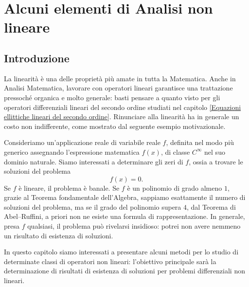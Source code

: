 

\chapter{Alcuni elementi di Analisi non lineare}\label{Alcuni elementi di Analisi non lineare}

\section{Introduzione}
La linearità è una delle proprietà più amate in tutta la Matematica. Anche in Analisi Matematica, lavorare con operatori lineari garantisce una trattazione pressoché organica e molto generale: basti pensare a quanto visto per gli operatori differenziali lineari del secondo ordine studiati nel capitolo \ref{Equazioni ellittiche lineari del secondo ordine}. Rinunciare alla linearità ha in generale un costo non indifferente, come mostrato dal seguente esempio motivazionale.
\begin{esempio}\label{equazionialgebriche}
	Consideriamo un'applicazione reale di variabile reale $f$, definita nel modo più generico assegnando l'espressione matematica $f(x)$, di classe $C^\infty$ nel suo dominio naturale. Siamo interessati a determinare gli zeri di $f$, ossia a trovare le soluzioni del problema
	\[ f(x) = 0. \]
	Se $f$ è lineare, il problema è banale. Se $f$ è un polinomio di grado almeno $1$, grazie al Teorema fondamentale dell'Algebra, sappiamo esattamente il numero di soluzioni del problema, ma se il grado del polinomio supera $4$, dal Teorema di Abel--Ruffini, a priori non ne esiste una formula di rappresentazione. In generale, presa $f$ qualsiasi, il problema può rivelarsi insidioso: potrei non avere nemmeno un risultato di esistenza di soluzioni.
\end{esempio}

In questo capitolo siamo interessati a presentare alcuni metodi per lo studio di determinate classi di operatori non lineari: l'obiettivo principale sarà la determinazione di risultati di esistenza di soluzioni per problemi differenziali non lineari.

